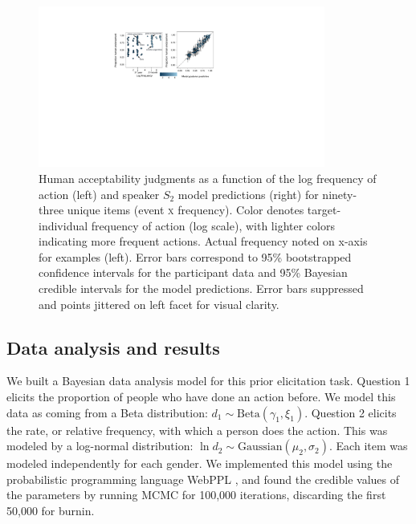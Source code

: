 \documentclass[10pt,letterpaper]{article}
\begin{document}
\begin{figure}[t]
\centering
  \includegraphics[width=0.84\textwidth]{tj-scatters-3}
  \caption{
  Human acceptability judgments as a function of the log frequency of action (left) and speaker $S_2$ model predictions (right) for ninety-three unique items (event \textsc{x} frequency). 
  Color denotes target-individual frequency of action (log scale), with lighter colors indicating more frequent actions. 
  Actual frequency noted on x-axis for examples (left).
  Error bars correspond to 95\% bootstrapped confidence intervals for the participant data and 95\% Bayesian credible intervals for the model predictions. 
  Error bars suppressed and points jittered on left facet for visual clarity.
  }
  \label{fig:tjScatters}
\end{figure}

\vspace{-0.5ex}

\subsection{Data analysis and results}
We built a Bayesian data analysis model for this prior elicitation task.
Question 1 elicits the proportion of people who have done an action before. 
We model this data as coming from a Beta distribution: $d_{1} \sim \text{Beta}(\gamma_{1}, \xi_{1})$. 
Question 2 elicits the rate, or relative frequency, with which a person does the action.
This was modeled by a log-normal distribution: $\ln d_{2} \sim \text{Gaussian}(\mu_{2}, \sigma_{2})$. 
Each item was modeled independently for each gender.
We implemented this model using the probabilistic programming language WebPPL \cite{dippl}, and found the credible values of the parameters by running MCMC for 100,000 iterations, discarding the first 50,000 for burnin.
%
\end{document}
